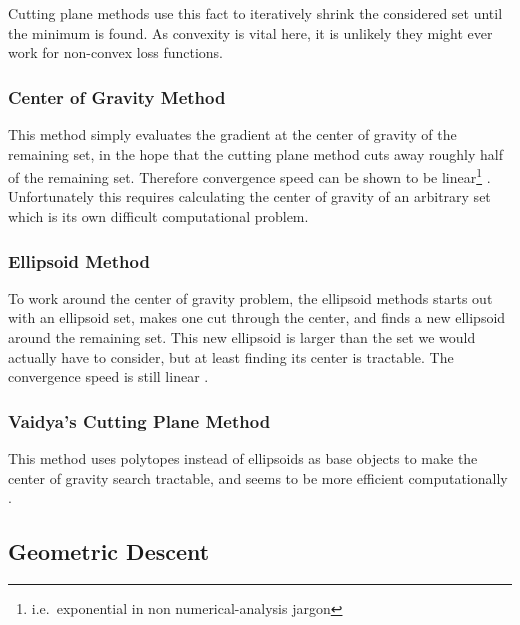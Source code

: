Cutting plane methods use this fact to iteratively shrink the considered set
until the minimum is found. As convexity is vital here, it is unlikely they
might ever work for non-convex loss functions.

\subsubsection{Center of Gravity Method}

This method simply evaluates the gradient at the center of gravity of the
remaining set, in the hope that the cutting plane method cuts away roughly half
of the remaining set. Therefore convergence speed can be shown to be
linear\footnote{i.e.\ exponential in non numerical-analysis jargon} 
\parencite[e.g.][Theorem 2.1]{bubeckConvexOptimizationAlgorithms2015}.
Unfortunately this requires calculating the center of gravity of an arbitrary
set which is its own difficult computational problem. 

\subsubsection{Ellipsoid Method}

To work around the center of gravity problem, the ellipsoid methods starts out
with an ellipsoid set, makes one cut through the center, and finds a new
ellipsoid around the remaining set. This new ellipsoid is larger than the
set we would actually have to consider, but at least finding its center is
tractable. The convergence speed is still linear \parencite[e.g][Theorem
2.4]{bubeckConvexOptimizationAlgorithms2015}.


\subsubsection{Vaidya's Cutting Plane Method}

This method uses polytopes instead of ellipsoids as base objects to make the
center of gravity search tractable, and seems to be more efficient
computationally \parencite[e.g.][Section
2.3]{bubeckConvexOptimizationAlgorithms2015}.

\subsection{Geometric Descent}


